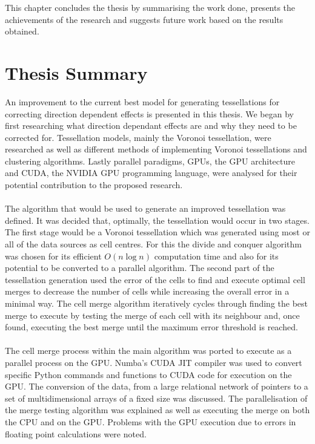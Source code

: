 This chapter concludes the thesis by summarising the work done, presents the achievements of the research and suggests future work based on the results obtained.
\section{Thesis Summary}
An improvement to the current best model for generating tessellations for correcting direction dependent effects is presented in this thesis. We began by first researching what direction dependant effects are and why they need to be corrected for. Tessellation models, mainly the Voronoi tessellation, were researched as well as different methods of implementing Voronoi tessellations and clustering algorithms. Lastly parallel paradigms, GPUs, the GPU architecture and CUDA, the NVIDIA GPU programming language, were analysed for their potential contribution to the proposed research.
\\
\\
The algorithm that would be used to generate an improved tessellation was defined. It was decided that, optimally, the tessellation would occur in two stages. The first stage would be a Voronoi tessellation which was generated using most or all of the data sources as cell centres. For this the divide and conquer algorithm was chosen for its efficient $O(n\log n)$ computation time and also for its potential to be converted to a parallel algorithm. The second part of the tessellation generation used the error of the cells to find and execute optimal cell merges to decrease the number of cells while increasing the overall error in a minimal way. The cell merge algorithm iteratively cycles through finding the best merge to execute by testing the merge of each cell with its neighbour and, once found, executing the best merge until the maximum error threshold is reached.
\\
\\
The cell merge process within the main algorithm was ported to execute as a parallel process on the GPU. Numba's CUDA JIT compiler was used to convert specific Python commands and functions to CUDA code for execution on the GPU. The conversion of the data, from a large relational network of pointers to a set of multidimensional arrays of a fixed size was discussed. The parallelisation of the merge testing algorithm was explained as well as executing the merge on both the CPU and on the GPU. Problems with the GPU execution due to errors in floating point calculations were noted.
\\
